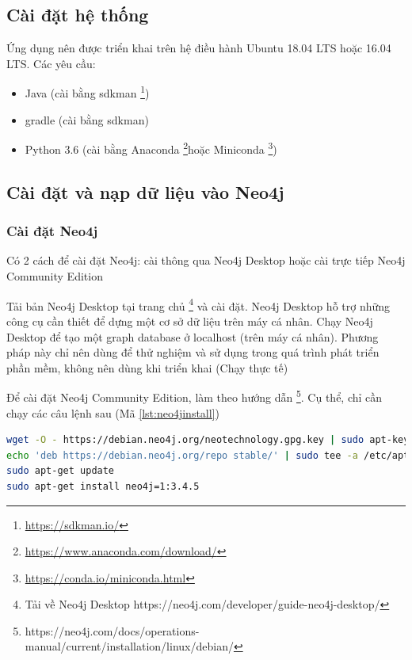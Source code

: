 \subsection{Cài đặt hệ thống}

Ứng dụng nên được triển khai trên hệ điều hành Ubuntu 18.04 LTS hoặc 16.04 LTS. Các yêu cầu: 

\begin{itemize}
\item Java (cài bằng sdkman \footnote{\url{https://sdkman.io/}})
\item gradle (cài bằng sdkman)
\item Python 3.6 (cài bằng Anaconda \footnote{\url{https://www.anaconda.com/download/}}hoặc Miniconda \footnote{\url{https://conda.io/miniconda.html}})
\end{itemize}

\subsection{Cài đặt và nạp dữ liệu vào Neo4j}
\subsubsection{Cài đặt Neo4j} \label{sec:installneo4jinstance}

Có 2 cách để cài đặt Neo4j: cài thông qua Neo4j Desktop hoặc cài trực tiếp Neo4j Community Edition

Tải bản Neo4j Desktop tại trang chủ \footnote{Tải về Neo4j Desktop https://neo4j.com/developer/guide-neo4j-desktop/} và cài đặt. Neo4j Desktop hỗ trợ những công cụ cần thiết để dựng một cơ sở dữ liệu trên máy cá nhân. Chạy Neo4j Desktop để tạo một graph database ở localhost (trên máy cá nhân). Phương pháp này chỉ nên dùng để thử nghiệm và sử dụng trong quá trình phát triển phần mềm, không nên dùng khi triển khai (Chạy thực tế)

Để cài đặt Neo4j Community Edition, làm theo hướng dẫn \footnote{https://neo4j.com/docs/operations-manual/current/installation/linux/debian/}. Cụ thể, chỉ cần chạy các câu lệnh sau (Mã \ref{lst:neo4jinstall})

\begin{lstlisting}[basicstyle=\tiny,language=bash,caption={Cài Neo4j},label={lst:neo4jinstall}]
wget -O - https://debian.neo4j.org/neotechnology.gpg.key | sudo apt-key add -
echo 'deb https://debian.neo4j.org/repo stable/' | sudo tee -a /etc/apt/sources.list.d/neo4j.list
sudo apt-get update
sudo apt-get install neo4j=1:3.4.5
\end{lstlisting}

